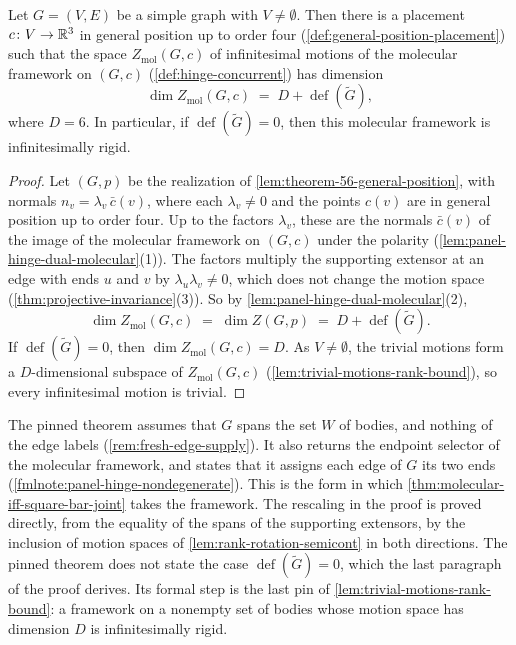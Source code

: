\begin{theorem}
  \label{thm:panel-hinge-iff-molecular}
  \leanok
  Let $G = (V, E)$ be a simple graph with $V \neq \emptyset$. Then there
  is a placement $c \colon V \to {\mathbb{R}}^3$ in general position up to order
  four (\cref{def:general-position-placement}) such that the space
  $Z_{\mathrm{mol}}(G, c)$ of infinitesimal motions of the molecular
  framework on $(G, c)$ (\cref{def:hinge-concurrent}) has dimension
  \[
    \dim Z_{\mathrm{mol}}(G, c) \;=\; D + \operatorname{def}(\tilde G),
  \]
  where $D = 6$. In particular, if $\operatorname{def}(\tilde G) = 0$,
  then this molecular framework is infinitesimally rigid.
\end{theorem}
\begin{proof}
  \leanok
  Let $(G, p)$ be the realization of
  \cref{lem:theorem-56-general-position}, with normals
  $n_v = \lambda_v\, \bar c(v)$, where each $\lambda_v \neq 0$ and the
  points $c(v)$ are in general position up to order four. Up to the
  factors $\lambda_v$, these are the normals $\bar c(v)$ of the image of
  the molecular framework on $(G, c)$ under the polarity
  (\cref{lem:panel-hinge-dual-molecular}(1)). The factors multiply the
  supporting extensor at an edge with ends $u$ and $v$ by
  $\lambda_u \lambda_v \neq 0$, which does not change the motion space
  (\cref{thm:projective-invariance}(3)). So by
  \cref{lem:panel-hinge-dual-molecular}(2),
  \[
    \dim Z_{\mathrm{mol}}(G, c) \;=\; \dim Z(G, p)
    \;=\; D + \operatorname{def}(\tilde G).
  \]
  If $\operatorname{def}(\tilde G) = 0$, then
  $\dim Z_{\mathrm{mol}}(G, c) = D$. As $V \neq \emptyset$, the trivial
  motions form a $D$-dimensional subspace of $Z_{\mathrm{mol}}(G, c)$
  (\cref{lem:trivial-motions-rank-bound}), so every infinitesimal motion
  is trivial.
\end{proof}

\begin{fmlnote}
  The pinned theorem assumes that $G$ spans the set $W$ of bodies, and
  nothing of the edge labels (\cref{rem:fresh-edge-supply}). It also returns
  the endpoint selector of the molecular framework, and states that it
  assigns each edge of $G$ its two ends
  (\cref{fmlnote:panel-hinge-nondegenerate}). This is the form in which
  \cref{thm:molecular-iff-square-bar-joint} takes the framework. The
  rescaling in the proof is proved directly, from the equality of the
  spans of the supporting extensors, by the inclusion of motion spaces
  of \cref{lem:rank-rotation-semicont} in both directions.
  The pinned theorem does not state the case
  $\operatorname{def}(\tilde G) = 0$, which the last paragraph of the
  proof derives. Its formal step is the last pin of
  \cref{lem:trivial-motions-rank-bound}: a framework on a nonempty set
  of bodies whose motion space has dimension $D$ is infinitesimally
  rigid.
\end{fmlnote}

